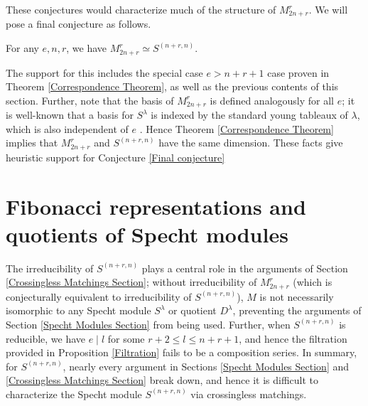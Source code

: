\documentclass{amsart}
\begin{document}
 These conjectures would characterize much of the structure of $M_{2n + r}^r$.
 We will pose a final conjecture as follows.
 \begin{conjecture}\label{Final conjecture}
 	For any $e,n,r$, we have $M_{2n + r}^r \simeq S^{(n+r,n)}$.
 \end{conjecture}
 The support for this includes the special case $e > n+r+1$ case proven in Theorem \ref{Correspondence Theorem}, as well as the previous contents of this section.
 Further, note that the basis of $M_{2n + r}^r$ is defined analogously for all $e$;
 it is well-known that a basis for $S^\lambda$ is indexed by the standard young tableaux of $\lambda$, which is also independent of $e$ \cite[Prop.~3.22]{Mathas-book}.
 Hence Theorem \ref{Correspondence Theorem} implies that $M_{2n + r}^r$ and $S^{(n+r,n)}$ have the same dimension. 
  These facts give heuristic support for Conjecture \ref{Final conjecture}
 
\section{Fibonacci representations and quotients of Specht modules}\label{Fibonacci Section}
The irreducibility of $S^{(n+r,n)}$ plays a central role in the arguments of Section \ref{Crossingless Matchings Section};
without irreducibility of $M_{2n + r}^r$ (which is conjecturally equivalent to irreducibility of $S^{(n+r,n)}$), $M$ is not necessarily isomorphic to any Specht module $S^\lambda$ or quotient $D^\lambda$, preventing the arguments of Section \ref{Specht Modules Section} from being used.
Further, when $S^{(n+r,n)}$ is reducible, we have $e \mid l$ for some $r+2 \leq l \leq n+r+1$, and hence the filtration provided in Proposition \ref{Filtration} fails to be a composition series.
In summary, for $S^{(n+r,n)}$, nearly every argument in Sections \ref{Specht Modules Section} and \ref{Crossingless Matchings Section} break down, and hence it is difficult to characterize the Specht module $S^{(n+r,n)}$ via crossingless matchings.
\end{document}

